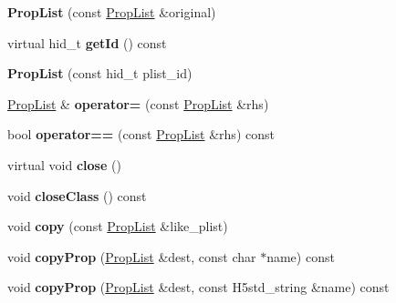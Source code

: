 \begin{DoxyCompactItemize}
{\bfseries Prop\+List} (const \hyperlink{class_h5_1_1_prop_list}{Prop\+List} \&original)
\item 
\mbox{\label{class_h5_1_1_prop_list_a619a8caaa337e60d9d159db932ae2fb0}} 
virtual hid\+\_\+t {\bfseries get\+Id} () const
\item 
\mbox{\label{class_h5_1_1_prop_list_acd354e858c9ed4be9943bb3ff583a41e}} 
{\bfseries Prop\+List} (const hid\+\_\+t plist\+\_\+id)
\item 
\mbox{\label{class_h5_1_1_prop_list_a63ebb8bd80e75b004188a4adc0239e9a}} 
\hyperlink{class_h5_1_1_prop_list}{Prop\+List} \& {\bfseries operator=} (const \hyperlink{class_h5_1_1_prop_list}{Prop\+List} \&rhs)
\item 
\mbox{\label{class_h5_1_1_prop_list_a1ca098347ed5221de88f82830a1f7c72}} 
bool {\bfseries operator==} (const \hyperlink{class_h5_1_1_prop_list}{Prop\+List} \&rhs) const
\item 
\mbox{\label{class_h5_1_1_prop_list_a4c3edf6de6770d32a27bc0c39efb6ee5}} 
virtual void {\bfseries close} ()
\item 
\mbox{\label{class_h5_1_1_prop_list_ab7dd04ecd6353aa9a4abd812ac39bc5e}} 
void {\bfseries close\+Class} () const
\item 
\mbox{\label{class_h5_1_1_prop_list_a7ddaf55c2144f91013ced20f9139de74}} 
void {\bfseries copy} (const \hyperlink{class_h5_1_1_prop_list}{Prop\+List} \&like\+\_\+plist)
\item 
\mbox{\label{class_h5_1_1_prop_list_ab6692af209e868d867d38d15b7e6ba2b}} 
void {\bfseries copy\+Prop} (\hyperlink{class_h5_1_1_prop_list}{Prop\+List} \&dest, const char $\ast$name) const
\item 
\mbox{\label{class_h5_1_1_prop_list_a806af10434d78f9da162c11280a91e94}} 
void {\bfseries copy\+Prop} (\hyperlink{class_h5_1_1_prop_list}{Prop\+List} \&dest, const H5std\+\_\+string \&name) const
\item 
\mbox{\label{class_h5_1_1_prop_list_a0b56558b90895a135b51f48152b179f9}} 

\end{DoxyCompactItemize}
